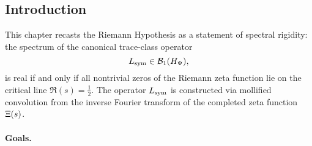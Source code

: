 \subsection*{Introduction}
\label{sec:intro_spectral_rigidity}

This chapter recasts the Riemann Hypothesis as a statement of spectral rigidity: the spectrum of the canonical trace-class operator
\[
L_{\mathrm{sym}} \in \mathcal{B}_1(H_{\Psi}),
\]
is real if and only if all nontrivial zeros of the Riemann zeta function lie on the critical line \( \Re(s) = \tfrac{1}{2} \). The operator \( L_{\mathrm{sym}} \) is constructed via mollified convolution from the inverse Fourier transform of the completed zeta function \( \Xi(s) \).

\paragraph{Goals.}
